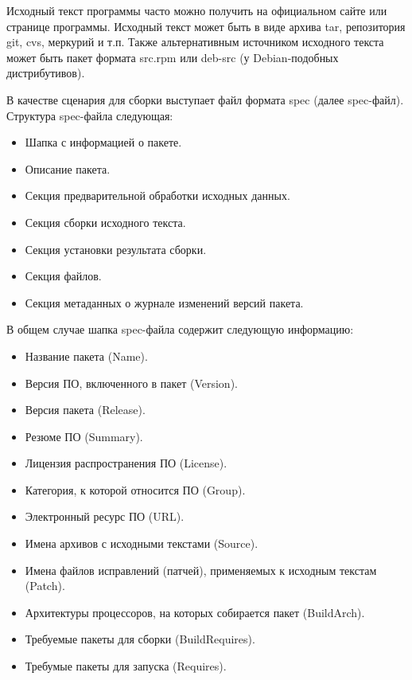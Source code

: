 \documentclass[bachelor, och, pract]{SCWorks}
\begin{document}
Исходный текст программы часто можно получить на официальном сайте или странице программы.
Исходный текст может быть в виде архива tar, репозитория git, cvs, меркурий и т.п.
Также альтернативным источником исходного текста может быть пакет формата src.rpm или deb-src (у Debian-подобных дистрибутивов).

В качестве сценария для сборки выступает файл формата spec (далее spec-файл).
Структура spec-файла следующая:
\begin{itemize}                                                                           
    \item Шапка с информацией о пакете.                          
    \item Описание пакета.              
    \item Секция предварительной обработки исходных данных.
    \item Секция сборки исходного текста.
    \item Секция установки результата сборки.
    \item Секция файлов.
    \item Секция метаданных о журнале изменений версий пакета.
\end{itemize}

В общем случае шапка spec-файла содержит следующую информацию:
\begin{itemize}                                                                                      
    \item Название пакета (Name).                                                              
    \item Версия ПО, включенного в пакет (Version).                                                                           
    \item Версия пакета (Release).                                          
    \item Резюме ПО (Summary).                                                            
    \item Лицензия распространения ПО (License).                   
    \item Категория, к которой относится ПО (Group).
    \item Электронный ресурс ПО (URL). 
    \item Имена архивов с исходными текстами (Source).
    \item Имена файлов исправлений (патчей), применяемых к исходным текстам (Patch).
    \item Архитектуры процессоров, на которых собирается пакет (BuildArch).
    \item Требуемые пакеты для сборки (BuildRequires).
    \item Требумые пакеты для запуска (Requires).
\end{itemize}
\end{document}
